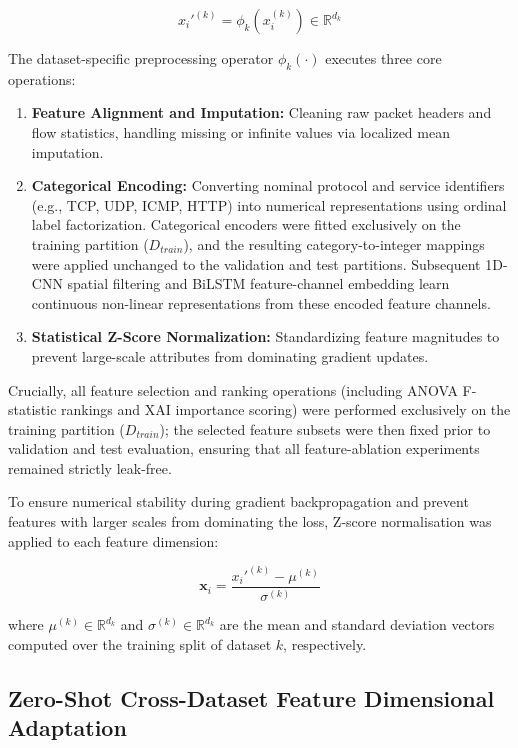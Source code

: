 \documentclass[a4paper,fleqn]{cas-sc}
\begin{document}
\begin{equation}
x_i'^{(k)} = \phi_k(x_i^{(k)}) \in \mathbb{R}^{d_k}
\end{equation}

The dataset-specific preprocessing operator $\phi_k(\cdot)$ executes three core operations:
\begin{enumerate}
    \item \textbf{Feature Alignment and Imputation:} Cleaning raw packet headers and flow statistics, handling missing or infinite values via localized mean imputation.
    \item \textbf{Categorical Encoding:} Converting nominal protocol and service identifiers (e.g., TCP, UDP, ICMP, HTTP) into numerical representations using ordinal label factorization. Categorical encoders were fitted exclusively on the training partition ($D_{train}$), and the resulting category-to-integer mappings were applied unchanged to the validation and test partitions. Subsequent 1D-CNN spatial filtering and BiLSTM feature-channel embedding learn continuous non-linear representations from these encoded feature channels.
    \item \textbf{Statistical Z-Score Normalization:} Standardizing feature magnitudes to prevent large-scale attributes from dominating gradient updates.
\end{enumerate}

Crucially, all feature selection and ranking operations (including ANOVA F-statistic rankings and XAI importance scoring) were performed exclusively on the training partition ($D_{train}$); the selected feature subsets were then fixed prior to validation and test evaluation, ensuring that all feature-ablation experiments remained strictly leak-free.

To ensure numerical stability during gradient backpropagation and prevent features with larger scales from dominating the loss, Z-score normalisation was applied to each feature dimension:

\begin{equation}
\mathbf{x}_i = \frac{x_i'^{(k)} - \mu^{(k)}}{\sigma^{(k)}}
\end{equation}

where $\mu^{(k)} \in \mathbb{R}^{d_k}$ and $\sigma^{(k)} \in \mathbb{R}^{d_k}$ are the mean and standard deviation vectors computed over the training split of dataset $k$, respectively.

\subsection{Zero-Shot Cross-Dataset Feature Dimensional Adaptation}
\end{document}
